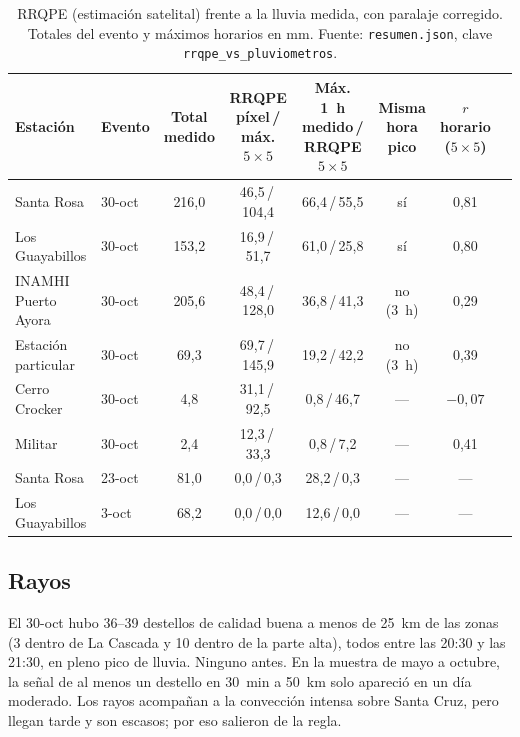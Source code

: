 \documentclass{sosg-informe}
\begin{document}
\begin{table}[ht]
  \centering\small
  \caption{RRQPE (estimación satelital) frente a la lluvia medida, con paralaje corregido. Totales del evento y máximos horarios en mm. Fuente: \texttt{resumen.json}, clave \texttt{rrqpe\_vs\_pluviometros}.}
  \label{tab:rrqpe}
  \setlength{\tabcolsep}{3.5pt}
  \begin{tabular}{llcccccc}
    \toprule
    Estación & Evento & \makecell{Total\\medido} & \makecell{RRQPE píxel\,/\\máx. $5\times5$} & \makecell{Máx. 1~h medido\,/\\RRQPE $5\times5$} & \makecell{Misma hora\\pico} & \makecell{$r$ horario\\($5\times5$)} \\
    \midrule
    Santa Rosa & 30-oct & 216,0 & 46,5\,/\,104,4 & 66,4\,/\,55,5 & sí & 0,81 \\
    Los Guayabillos & 30-oct & 153,2 & 16,9\,/\,51,7 & 61,0\,/\,25,8 & sí & 0,80 \\
    INAMHI Puerto Ayora & 30-oct & 205,6 & 48,4\,/\,128,0 & 36,8\,/\,41,3 & no (3~h) & 0,29 \\
    Estación particular & 30-oct & 69,3 & 69,7\,/\,145,9 & 19,2\,/\,42,2 & no (3~h) & 0,39 \\
    Cerro Crocker & 30-oct & 4,8 & 31,1\,/\,92,5 & 0,8\,/\,46,7 & --- & $-0,07$ \\
    Militar & 30-oct & 2,4 & 12,3\,/\,33,3 & 0,8\,/\,7,2 & --- & 0,41 \\
    \addlinespace
    Santa Rosa & 23-oct & 81,0 & 0,0\,/\,0,3 & 28,2\,/\,0,3 & --- & --- \\
    Los Guayabillos & 3-oct & 68,2 & 0,0\,/\,0,0 & 12,6\,/\,0,0 & --- & --- \\
    \bottomrule
  \end{tabular}
\end{table}

\subsection{Rayos}\label{sec:rayos}
El 30-oct hubo 36--39 destellos de calidad buena a menos de 25~km de las zonas (3 dentro de La Cascada y 10 dentro de la parte alta), todos entre las 20:30 y las 21:30, en pleno pico de lluvia. Ninguno antes. En la muestra de mayo a octubre, la señal de al menos un destello en 30~min a 50~km solo apareció en un día moderado. Los rayos acompañan a la convección intensa sobre Santa Cruz, pero llegan tarde y son escasos; por eso salieron de la regla.
\end{document}
